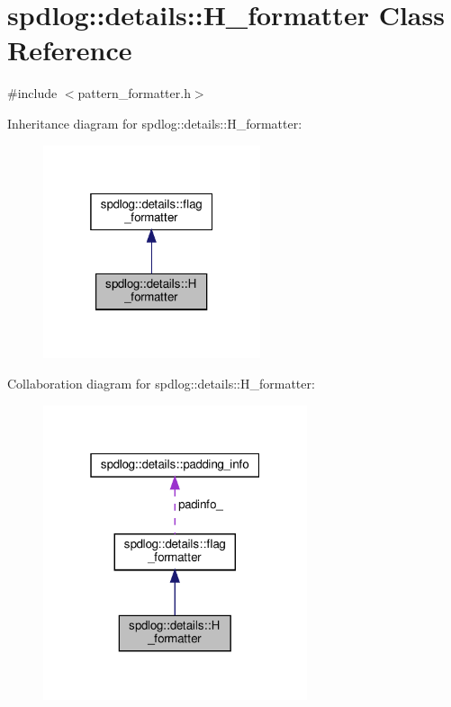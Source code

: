 \hypertarget{classspdlog_1_1details_1_1_h__formatter}{}\section{spdlog\+:\+:details\+:\+:H\+\_\+formatter Class Reference}
\label{classspdlog_1_1details_1_1_h__formatter}


{\ttfamily \#include $<$pattern\+\_\+formatter.\+h$>$}



Inheritance diagram for spdlog\+:\+:details\+:\+:H\+\_\+formatter\+:
\nopagebreak
\begin{figure}[H]
\begin{center}
\leavevmode
\includegraphics[width=181pt]{classspdlog_1_1details_1_1_h__formatter__inherit__graph}
\end{center}
\end{figure}


Collaboration diagram for spdlog\+:\+:details\+:\+:H\+\_\+formatter\+:
\nopagebreak
\begin{figure}[H]
\begin{center}
\leavevmode
\includegraphics[width=220pt]{classspdlog_1_1details_1_1_h__formatter__coll__graph}
\end{center}
\end{figure}
